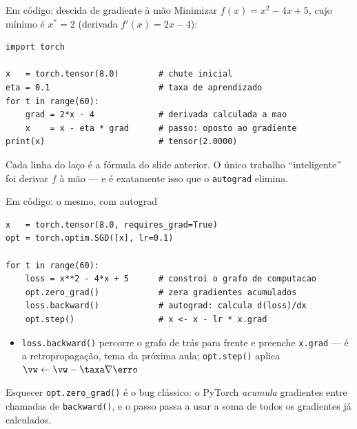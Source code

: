 \documentclass[aspectratio=169, 11pt]{beamer}
\begin{document}
\begin{frame}[fragile]{Em código: descida de gradiente à mão}
  Minimizar $f(x) = x^2 - 4x + 5$, cujo mínimo é $x^* = 2$
  (derivada $f'(x) = 2x - 4$):

\begin{lstlisting}
import torch

x   = torch.tensor(8.0)        # chute inicial
eta = 0.1                      # taxa de aprendizado
for t in range(60):
    grad = 2*x - 4             # derivada calculada a mao
    x    = x - eta * grad      # passo: oposto ao gradiente
print(x)                       # tensor(2.0000)
\end{lstlisting}

  \begin{ideiabox}
    Cada linha do laço é a fórmula do slide anterior. O único trabalho
    ``inteligente'' foi derivar $f$ à mão — e é exatamente isso que o
    \texttt{autograd} elimina.
  \end{ideiabox}
\end{frame}

\begin{frame}[fragile]{Em código: o mesmo, com autograd}
\begin{lstlisting}
x   = torch.tensor(8.0, requires_grad=True)
opt = torch.optim.SGD([x], lr=0.1)

for t in range(60):
    loss = x**2 - 4*x + 5      # constroi o grafo de computacao
    opt.zero_grad()            # zera gradientes acumulados
    loss.backward()            # autograd: calcula d(loss)/dx
    opt.step()                 # x <- x - lr * x.grad
\end{lstlisting}

  \begin{itemize}\setlength{\itemsep}{0.2ex}
    \item \texttt{loss.backward()} percorre o grafo de trás para frente e preenche
          \texttt{x.grad} — é a \alert{retropropagação}, tema da próxima aula;
          \texttt{opt.step()} aplica $\vw \leftarrow \vw - \taxa \nabla \erro$
  \end{itemize}

  \begin{alertabox}
    Esquecer \texttt{opt.zero\_grad()} é o bug clássico: o PyTorch \emph{acumula}
    gradientes entre chamadas de \texttt{backward()}, e o passo passa a usar a
    soma de todos os gradientes já calculados.
  \end{alertabox}
\end{frame}
\end{document}
